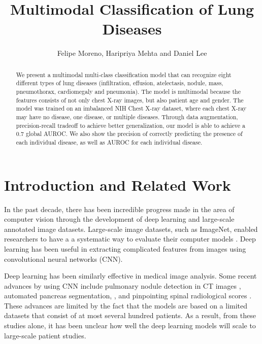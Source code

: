 \documentclass[10pt,letterpaper]{article}
\begin{document}
\title{Multimodal Classification of Lung Diseases}
\author{Felipe Moreno, Haripriya Mehta and Daniel Lee}

\maketitle

\begin{abstract}
We present a multimodal multi-class classification model that can recognize eight different types of lung diseases (infiltration, effusion, atelectasis, nodule, mass, pneumothorax, cardiomegaly and pneumonia). The model is multimodal because the features consists of not only chest X-ray images, but also patient age and gender. The model was trained on an imbalanced NIH Chest X-ray dataset, where each chest X-ray may have no disease, one disease, or multiple diseases. Through data augmentation, precision-recall tradeoff to achieve better generalization, our model is able to achieve a 0.7 global AUROC. We also show the precision of correctly predicting the presence of each individual disease, as well as AUROC for each individual disease.
\end{abstract}

\section{Introduction and Related Work}

In the past decade, there has been incredible progress made in the area of computer vision through the development of deep learning and large-scale annotated image datasets. Large-scale image datasets, such as ImageNet, enabled researchers to have a a systematic way to evaluate their computer models \cite{Imagenet}. Deep learning has been useful in extracting complicated features from images using convolutional neural networks (CNN).

Deep learning has been similarly effective in medical image analysis. Some recent advances by using CNN include pulmonary nodule detection in CT images \cite{Pulmonary}, automated pancreas segmentation, \cite{Deeporgan}, and pinpointing spinal radiological scores \cite{Spinenet}. These advances are limited by the fact that the models are based on a limited datasets that consist of at most several hundred patients. As a result, from these studies alone, it has been unclear how well the deep learning models will scale to large-scale patient studies.
\end{document}

